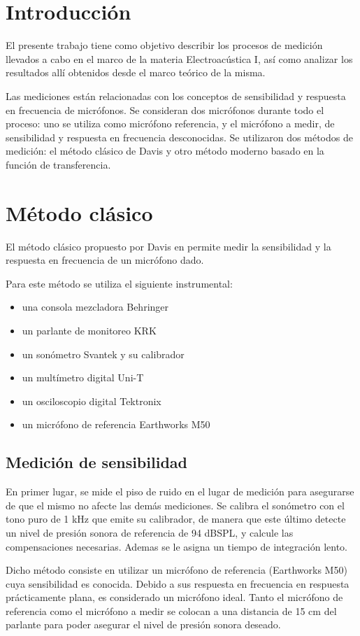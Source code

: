 \documentclass[]{article}
\begin{document}
\begin{multicols}{2}
\section{Introducción}
El presente trabajo tiene como objetivo describir los procesos de medición
llevados a cabo en el marco de la materia Electroacústica I, así como analizar
los resultados allí obtenidos desde el marco teórico de la misma.

Las mediciones están relacionadas con los conceptos de sensibilidad y respuesta
 en frecuencia de micrófonos. Se consideran dos micrófonos durante todo el
proceso: uno se utiliza como micrófono referencia, y el micrófono a medir, de
sensibilidad y respuesta en frecuencia desconocidas. Se utilizaron dos métodos
de medición: el método clásico de Davis y otro método moderno basado en la
función de transferencia.
\section{Método clásico}
El método clásico propuesto por Davis en \cite{davis} permite medir
la sensibilidad y la respuesta en frecuencia de un micrófono dado.

Para este método se utiliza el siguiente instrumental:
\begin{itemize}
\item una consola mezcladora Behringer
\item un parlante de monitoreo KRK
\item un sonómetro Svantek y su calibrador
\item un multímetro digital Uni-T
\item un osciloscopio digital Tektronix
\item un micrófono de referencia Earthworks M50
\end{itemize}

\subsection{Medición de sensibilidad}
En primer lugar, se mide el piso de ruido en el lugar de medición para asegurarse
de que el mismo no afecte las demás mediciones. Se calibra el sonómetro con el
tono puro de 1 kHz que emite su calibrador, de manera que este último detecte un
nivel de presión sonora de referencia de 94 dBSPL, y calcule las compensaciones
necesarias. Ademas se le asigna un tiempo de integración lento.

Dicho método consiste en utilizar un micrófono de referencia (Earthworks M50)
cuya sensibilidad es conocida. Debido a sus respuesta en frecuencia en respuesta
prácticamente plana, es considerado un micrófono ideal. Tanto el micrófono de
referencia como el micrófono a medir se colocan a una distancia de 15 cm del
parlante para poder asegurar el nivel de presión sonora deseado.


\end{multicols}
\end{document}

